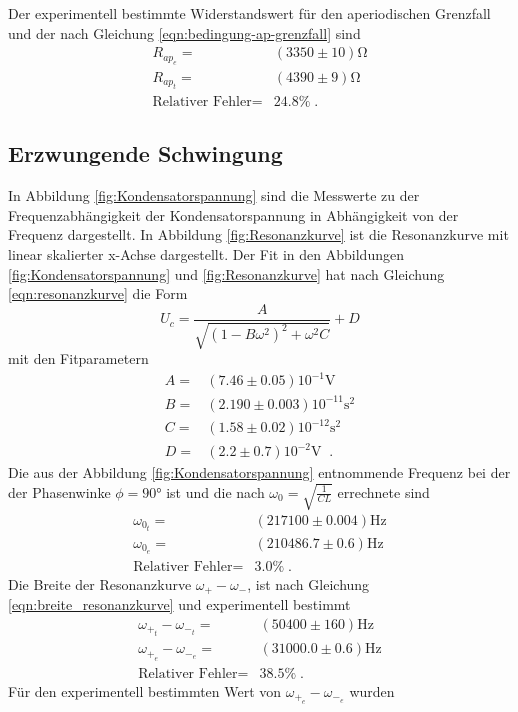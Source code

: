 Der experimentell bestimmte Widerstandswert für den aperiodischen Grenzfall
und  der nach Gleichung \eqref{eqn:bedingung-ap-grenzfall} sind
\begin{align*}
  R_{ap_e}=&(3350\pm10)\si{\ohm}\\
  R_{ap_t}=&(4390\pm9)\si{\ohm}\\
  \text{Relativer Fehler}=&24.8\%\;.
\end{align*}

\subsection{Erzwungende Schwingung}
In Abbildung \ref{fig:Kondensatorspannung} sind die
Messwerte zu der Frequenzabhängigkeit der Kondensatorspannung in Abhängigkeit
von der Frequenz dargestellt. In Abbildung \ref{fig:Resonanzkurve} ist die
Resonanzkurve mit linear skalierter x-Achse dargestellt. Der Fit  in den Abbildungen
\ref{fig:Kondensatorspannung} und \ref{fig:Resonanzkurve} hat nach
Gleichung \eqref{eqn:resonanzkurve} die Form
\begin{equation}
U_c=\frac{A}{\sqrt{(1-B\omega^2)^2+\omega^2 C}}+D
\end{equation}
mit den Fitparametern
\begin{align*}
 A=&(7.46\pm0.05)10^{-1}\si{\volt}\\
 B=&(2.190\pm0.003)10^{-11}\si{\second}^2\\
 C=&(1.58\pm0.02)10^{-12}\si{\second}^2\\
 D=&(2.2\pm0.7)10^{-2}\si{\volt}\;\;.
\end{align*}
Die aus der Abbildung \ref{fig:Kondensatorspannung}
entnommende Frequenz bei der der Phasenwinke $\phi=90°$ ist und die
nach $\omega_0=\sqrt{\frac{1}{CL}}$ errechnete sind
\begin{align*}
\omega_{0_t}=&(217100\pm0.004)\si{\hertz}\\
\omega_{0_e}=&(210486.7\pm0.6)\si{\hertz}\\
\text{Relativer Fehler}=&3.0\%\;.
\end{align*}
 Die Breite der
Resonanzkurve $\omega_+-\omega_- $, ist nach Gleichung \eqref{eqn:breite_resonanzkurve}
 und experimentell bestimmt
\begin{align*}
 \omega_{+_t}-\omega_{-_t}=&(50400\pm160)\si{\hertz}\\
 \omega_{+_e}-\omega_{-_e}=&(31000.0\pm0.6)\si{\hertz}\\
 \text{Relativer Fehler}=&38.5\%\;.
\end{align*}
Für den experimentell bestimmten Wert von $\omega_{+_e}-\omega_{-_e}$ wurden
